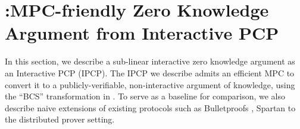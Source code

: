 \section{\name:MPC-friendly Zero Knowledge Argument from Interactive
PCP}\label{sec:graphene}
In this section, we describe a sub-linear interactive zero knowledge argument as
an Interactive PCP (IPCP). The IPCP we describe admits an efficient MPC to
convert it to a publicly-verifiable, non-interactive argument of knowledge,
using the ``BCS'' transformation in \cite{BCS16} .  To serve as a
baseline for comparison, we also describe naive extensions of existing protocols
such as Bulletproofs \cite{bulletproofs}, Spartan \cite{spartan} to the 
distributed prover setting. 

